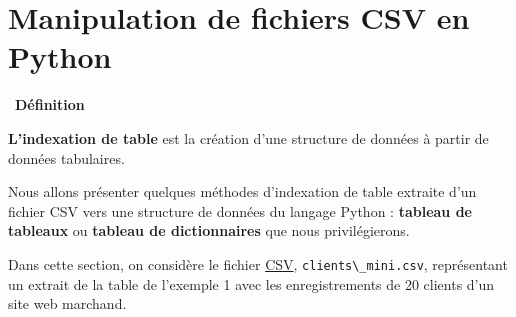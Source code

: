 \documentclass[
  11pt,
]{article}
\newcommand{\passthrough}[1]{#1}
\newcounter{def}
\newenvironment{definition}[1]
{\par \medskip   \addtocounter{def}{1} \noindent  
\begin{bclogo}[arrondi =0.1,  ombre = true, barre=none, logo=\bcbook, marge=4]{~\textbf{Définition} \textbf{\thedef} {\itshape #1} }  \par}
{
\end{bclogo}
 \par \bigskip }
\begin{document}
\hypertarget{manipulation-de-fichiers-csv-en-python}{%
\section{Manipulation de fichiers CSV en
Python}\label{manipulation-de-fichiers-csv-en-python}}

\begin{definition}{}

\textbf{L'indexation de table} est la création d'une structure de
données à partir de données tabulaires.

Nous allons présenter quelques méthodes d'indexation de table extraite
d'un fichier CSV vers une structure de données du langage Python :
\textbf{tableau de tableaux} ou \textbf{tableau de dictionnaires} que
nous privilégierons.

\end{definition}

Dans cette section, on considère le fichier
\href{https://fr.wikipedia.org/wiki/Comma-separated_values}{CSV},
\passthrough{\lstinline!clients\_mini.csv!}, représentant un extrait de
la table de l'exemple 1 avec les enregistrements de 20 clients d'un site
web marchand.
\end{document}
